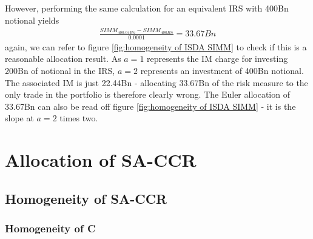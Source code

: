 \documentclass[../Thesis_AHoecherl.tex]{subfiles}
\begin{document}
    However, performing the same calculation for an equivalent IRS with 400Bn notional yields
    \begin{align*}
        \frac{SIMM_{400.04Bn} - SIMM_{400Bn}}{0.0001} = 33.67Bn
    \end{align*}
    again, we can refer to figure \ref{fig:homogeneity of ISDA SIMM} to check if this is a reasonable allocation result. As $a=1$ represents the IM charge for investing 200Bn of notional in the IRS, $a=2$ represents an investment of 400Bn notional. The associated IM is just 22.44Bn - allocating 33.67Bn of the risk measure to the only trade in the portfolio is therefore clearly wrong. The Euler allocation of 33.67Bn can also be read off figure \ref{fig:homogeneity of ISDA SIMM} - it is the slope at $a=2$ times two.



    \section{Allocation of SA-CCR}\label{Allocation of SA-CCR}

    \subsection{Homogeneity of SA-CCR}

    \subsubsection{Homogeneity of C}
\end{document}
